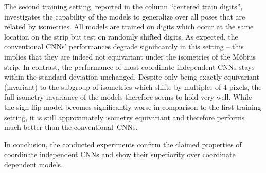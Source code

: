 The second training setting, reported in the column ``centered train digits'', investigates the capability of the models to generalize over all poses that are related by isometries.
All models are trained on digits which occur at the same location on the strip but test on randomly shifted digits.
As expected, the conventional CNNs' performances degrade significantly in this setting -- this implies that they are indeed not equivariant under the isometries of the M\"obius strip.
In contrast, the performance of most coordinate independent CNNs stays within the standard deviation unchanged.
Despite only being exactly equivariant (invariant) to the subgroup of isometries which shifts by multiples of $4$ pixels, the full isometry invariance of the models therefore seems to hold very well.
While the sign-flip model becomes significantly worse in comparison to the first training setting, it is still approximately isometry equivariant and therefore performs much better than the conventional~CNNs.

In conclusion, the conducted experiments confirm the claimed properties of coordinate independent CNNs and show their superiority over coordinate dependent models.

